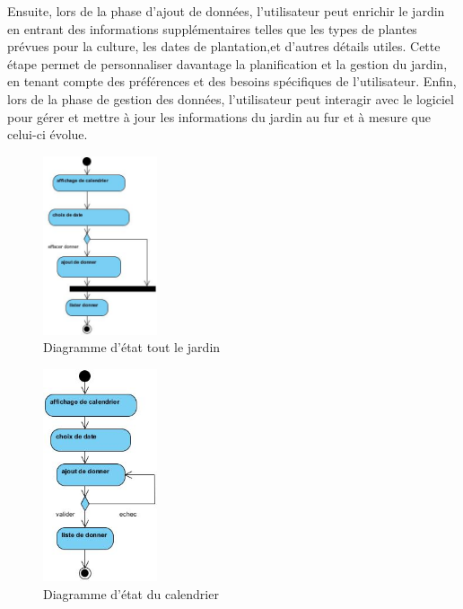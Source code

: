 	Ensuite, lors de la phase d'ajout de données, l'utilisateur peut enrichir le jardin en entrant des informations supplémentaires telles que les types de plantes prévues pour la culture, les dates de plantation,et d'autres détails utiles. Cette étape permet de personnaliser davantage la planification et la gestion du jardin, en tenant compte des préférences et des besoins spécifiques de l'utilisateur.
Enfin, lors de la phase de gestion des données, l'utilisateur peut interagir avec le logiciel pour gérer et mettre à jour les informations du jardin au fur et à mesure que celui-ci évolue. 
	\begin{figure}[!h]
    	\center
    		\includegraphics[width=0.3\textwidth]{image/diagrame2/gerer_potager_ancien.jpg}
   		\caption{Diagramme d'état tout le jardin}
    	\label{Diagramme d'état tout le jardin}
	\end{figure}
	
		\begin{figure}[!h]
    	\center
    		\includegraphics[width=0.3\textwidth]{image/diagrame2/calendrier.jpg}
   		\caption{Diagramme d'état du calendrier}
    	\label{Diagramme d'état}
	\end{figure}
	
